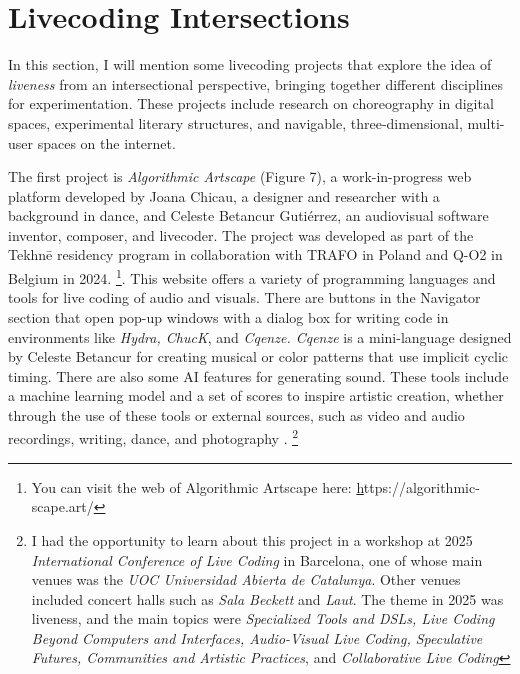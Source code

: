 \documentclass[12pt, twoside, a4paper]{report}
\begin{document}


\section{Livecoding Intersections}

In this section, I will mention some livecoding projects that explore the idea of \textit{liveness} from an intersectional perspective, bringing together different disciplines for experimentation.  These projects include research on choreography in digital spaces, experimental literary structures, and navigable, three-dimensional, multi-user spaces on the internet.


The first project is \textit{Algorithmic Artscape} (Figure 7), a work-in-progress web platform developed by Joana Chicau, a designer and researcher with a background in dance, and Celeste Betancur Gutiérrez, an audiovisual software inventor, composer, and livecoder. The project was developed as part of the Tekhnē residency program in collaboration with TRAFO in Poland and Q-O2 in Belgium in 2024. \footnote{You can visit the web of Algorithmic Artscape here: \href{https://algorithmic-scape.art/}https://algorithmic-scape.art/}. 
This website offers a variety of programming languages and tools for live coding of audio and visuals. There are buttons in the Navigator section that open pop-up windows with a dialog box for writing code in environments like \textit{Hydra, ChucK}, and \textit{Cqenze. Cqenze} is a mini-language designed by Celeste Betancur for creating musical or color patterns that use implicit cyclic timing. There are also some AI features for generating sound. These tools include a machine learning model and a set of scores to inspire artistic creation, whether through the use of these tools or external sources, such as video and audio recordings, writing, dance, and photography \citep{artscape}. \footnote{I had the opportunity to learn about this project in a workshop at 2025 \textit{International Conference of Live Coding} in Barcelona, one of whose main venues was the \textit{UOC Universidad Abierta de Catalunya}. Other venues included concert halls such as \textit{Sala Beckett} and \textit{Laut}.
The theme in 2025 was liveness, and the main topics were \textit{Specialized Tools and DSLs, Live Coding Beyond Computers and Interfaces, Audio-Visual Live Coding, Speculative Futures, Communities and Artistic Practices}, and \textit{Collaborative Live Coding}}
\end{document}
